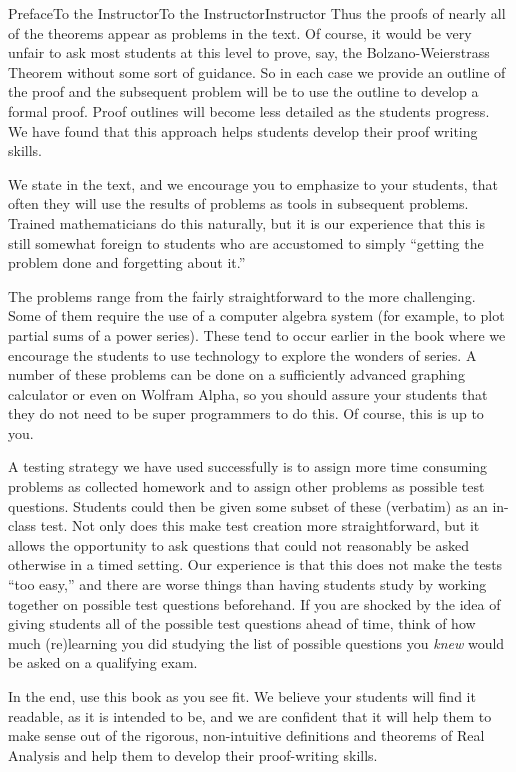 \documentclass[oneside,10pt,]{book}
\numberwithin{equation}{part}
\begin{document}
\begin{preface}{Preface}{To the Instructor}{}{To the Instructor}{}{}{Instructor}
Thus the proofs of nearly all of the theorems appear as problems in the text.  Of course, it would be very unfair to ask most students at this level to prove, say, the Bolzano-Weierstrass Theorem without some sort of guidance.  So in each case we provide an outline of the proof and the subsequent problem will be to use the outline to develop a formal proof.  Proof outlines will become less detailed as the students progress.  We have found that this approach helps students develop their proof writing skills.%
\par
We state in the text, and we encourage you to emphasize to your students, that often they will use the results of problems as tools in subsequent problems.  Trained mathematicians do this naturally, but it is our experience that this is still somewhat foreign to students who are accustomed to simply ``getting the problem done and forgetting about it.''%
\par
The problems range from the fairly straightforward to the more challenging.  Some of them require the use of a computer algebra system (for example, to plot partial sums of a power series). These tend to occur earlier in the book where we encourage the students to use technology to explore the wonders of series.  A number of these problems can be done on a sufficiently advanced graphing calculator or even on Wolfram Alpha, so you should assure your students that they do not need to be super programmers to do this.  Of course, this is up to you.%
\par
A testing strategy we have used successfully is to assign more time consuming problems as collected homework and to assign other problems as possible test questions.  Students could then be given some subset of these (verbatim) as an in-class test.  Not only does this make test creation more straightforward, but it allows the opportunity to ask questions that could not reasonably be asked otherwise in a timed setting.  Our experience is that this does not make the tests ``too easy,'' and there are worse things than having students study by working together on possible test questions beforehand.  If you are shocked by the idea of giving students all of the possible test questions ahead of time, think of how much (re)learning you did studying the list of possible questions you \emph{knew} would be asked on a qualifying exam.%
\par
In the end, use this book as you see fit.  We believe your students will find it readable, as it is intended to be, and we are confident that it will help them to make sense out of the rigorous, non-intuitive definitions and theorems of Real Analysis and help them to develop their proof-writing skills.%

\end{preface}
\end{document}
